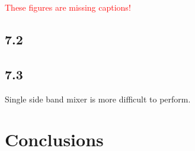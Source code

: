 \documentclass[a4paper]{article}
\begin{document}
\textcolor{red}{These figures are missing captions!}

\subsection{7.2}

\subsection{7.3}


Single side band mixer is more difficult to perform.

\section{Conclusions}



\end{document}
